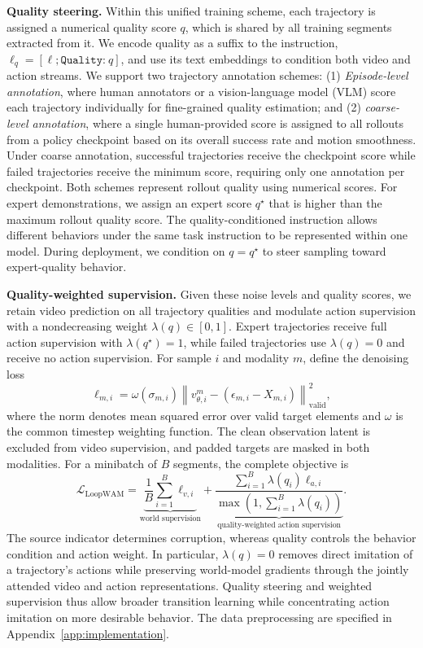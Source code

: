 \textbf{Quality steering.}
Within this unified training scheme, each trajectory is assigned a numerical quality score $q$, which is shared by all training segments extracted from it.
We encode quality as a suffix to the instruction, $\ell_q=[\ell;\texttt{Quality:}\ q]$, and use its text embeddings to condition both video and action streams.
We support two trajectory annotation schemes: (1) \emph{Episode-level annotation}, where human annotators or a vision-language model (VLM) score each trajectory individually for fine-grained quality estimation; and (2) \emph{coarse-level annotation}, where a single human-provided score is assigned to all rollouts from a policy checkpoint based on its overall success rate and motion smoothness.
Under coarse annotation, successful trajectories receive the checkpoint score while failed trajectories receive the minimum score, requiring only one annotation per checkpoint.
Both schemes represent rollout quality using numerical scores.
For expert demonstrations, we assign an expert score $q^\star$ that is higher than the maximum rollout quality score.
The quality-conditioned instruction allows different behaviors under the same task instruction to be represented within one model.
During deployment, we condition on $q=q^\star$ to steer sampling toward expert-quality behavior.

\textbf{Quality-weighted supervision.}
\label{sec:quality_objective}
Given these noise levels and quality scores, we retain video prediction on all trajectory qualities and modulate action supervision with a nondecreasing weight $\lambda(q)\in[0,1]$.
Expert trajectories receive full action supervision with $\lambda(q^\star)=1$, while failed trajectories use $\lambda(q)=0$ and receive no action supervision.
For sample $i$ and modality $m$, define the denoising loss
\begin{equation}
    \ell_{m,i}=\omega(\sigma_{m,i})
    \left\|v_{\theta,i}^{m}-(\epsilon_{m,i}-X_{m,i})\right\|_{\mathrm{valid}}^2,
    \label{eq:modality_loss}
\end{equation}
where the norm denotes mean squared error over valid target elements and $\omega$ is the common timestep weighting function.
The clean observation latent is excluded from video supervision, and padded targets are masked in both modalities.
For a minibatch of $B$ segments, the complete objective is
\begin{equation}
    \mathcal L_{\mathrm{LoopWAM}}
    =\underbrace{\frac{1}{B}\sum_{i=1}^{B}\ell_{v,i}}_{\text{world supervision}}
    +\underbrace{\frac{\sum_{i=1}^{B}\lambda(q_i)\ell_{a,i}}
        {\max\!\left(1,\sum_{i=1}^{B}\lambda(q_i)\right)}}_{\text{quality-weighted action supervision}}.
    \label{eq:quality_loss}
\end{equation}
The source indicator determines corruption, whereas quality controls the behavior condition and action weight.
In particular, $\lambda(q)=0$ removes direct imitation of a trajectory's actions while preserving world-model gradients through the jointly attended video and action representations.
Quality steering and weighted supervision thus allow broader transition learning while concentrating action imitation on more desirable behavior.
The data preprocessing are specified in Appendix~\ref{app:implementation}.


